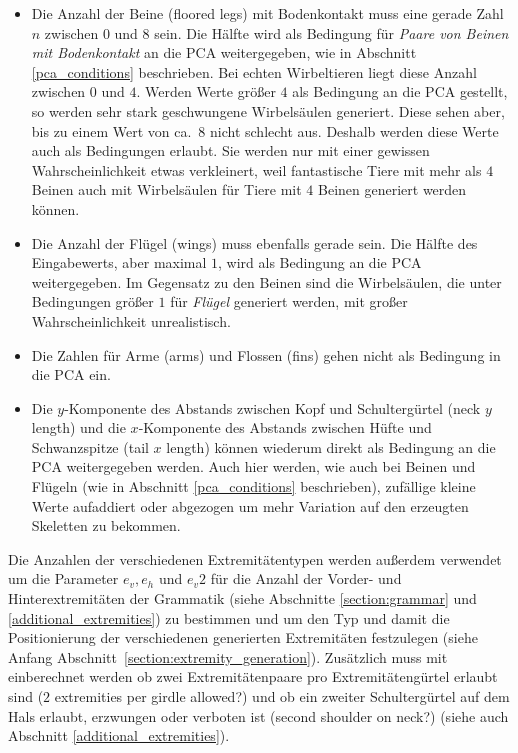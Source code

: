 \begin{itemize}
 \item Die Anzahl der Beine (floored legs) mit Bodenkontakt muss eine gerade Zahl $n$ zwischen $0$ und $8$ sein. Die Hälfte wird als Bedingung für \emph{Paare von Beinen mit Bodenkontakt} an die PCA weitergegeben, wie in Abschnitt \ref{pca_conditions} beschrieben. Bei echten Wirbeltieren liegt diese Anzahl zwischen $0$ und $4$. Werden Werte größer $4$ als Bedingung an die PCA gestellt, so werden sehr stark geschwungene Wirbelsäulen generiert. Diese sehen aber, bis zu einem Wert von ca.\ $8$ nicht schlecht aus. Deshalb werden diese Werte auch als Bedingungen erlaubt. Sie werden nur mit einer gewissen Wahrscheinlichkeit etwas verkleinert, weil fantastische Tiere mit mehr als $4$ Beinen auch mit Wirbelsäulen für Tiere mit $4$ Beinen generiert werden können.
 
 \item Die Anzahl der Flügel (wings) muss ebenfalls gerade sein. Die Hälfte des Eingabewerts, aber maximal $1$, wird als Bedingung an die PCA weitergegeben.
 Im Gegensatz zu den Beinen sind die Wirbelsäulen, die unter Bedingungen größer $1$ für \emph{Flügel} generiert werden, mit großer Wahrscheinlichkeit unrealistisch.
 
 \item Die Zahlen für Arme (arms) und Flossen (fins) gehen nicht als Bedingung in die PCA ein.
 
 \item Die $y$-Komponente des Abstands zwischen Kopf und Schultergürtel (neck $y$ length) und die $x$-Komponente des Abstands zwischen Hüfte und Schwanzspitze (tail $x$ length) können wiederum direkt als Bedingung an die PCA weitergegeben werden. Auch hier werden, wie auch bei Beinen und Flügeln (wie in Abschnitt \ref{pca_conditions} beschrieben), zufällige kleine Werte aufaddiert oder abgezogen um mehr Variation auf den erzeugten Skeletten zu bekommen.
\end{itemize}

Die Anzahlen der verschiedenen Extremitätentypen werden außerdem verwendet um die Parameter $e_v, e_h$ und $e_v2$ für die Anzahl der Vorder- und Hinterextremitäten der Grammatik (siehe Abschnitte \ref{section:grammar} und \ref{additional_extremities}) zu bestimmen und um den Typ und damit die Positionierung der verschiedenen generierten Extremitäten festzulegen (siehe Anfang \mbox{Abschnitt \ref{section:extremity_generation}}). Zusätzlich muss mit einberechnet werden ob zwei Extremitätenpaare pro Extremitätengürtel erlaubt sind ($2$ extremities per girdle allowed?) und ob ein zweiter Schultergürtel auf dem Hals erlaubt, erzwungen oder verboten ist (second shoulder on neck?) (siehe auch Abschnitt \ref{additional_extremities}).

